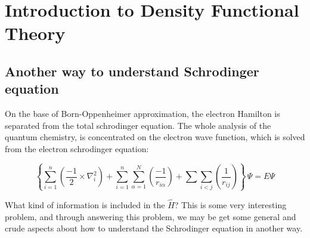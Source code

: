 %
%

%



\chapter{Introduction to Density Functional Theory}
\section{Another way to understand Schrodinger equation}
%
%
%
On the base of Born-Oppenheimer approximation, the electron Hamilton
is separated from the total schrodinger equation. The whole analysis
of the quantum chemistry, is concentrated on the electron wave
function, which is solved from the electron schrodinger equation:

\begin{equation}\label{DFTIeq:2}
  \left\{\sum_{i=1}^{n}(\frac{-1}{2}\times\nabla_{i}^2)
    +\sum_{i=1}^{n}\sum_{\alpha=1}^{N}
    (\frac{-1}{r_{i\alpha}})+\sum\sum_{i<j}(\frac{1}{r_{ij}})
  \right\}\,\Psi=E\Psi
\end{equation}

What kind of information is included in the $\hat{H}$? This is some
very interesting problem, and through answering this problem, we may
be get some general and crude aspects about how to understand the
Schrodinger equation in another way.

